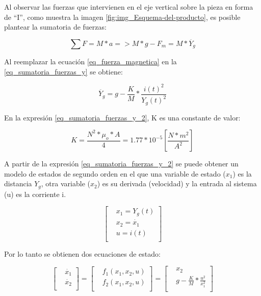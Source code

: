 \noindent Al observar las fuerzas que intervienen en el eje vertical sobre la pieza en forma de ``I'', como muestra la imagen \ref{fig:img_Esquema-del-producto}, es posible plantear la sumatoria de fuerzas:

\begin{equation}\label{eq_sumatoria_fuerzas_y}
	\sum F=M*a=>M*g-F_{m}=M*\ddot{Y_g}
\end{equation}

\noindent Al reemplazar la ecuación \ref{eq_fuerza_magnetica} en la \ref{eq_sumatoria_fuerzas_y} se obtiene:

\begin{equation}\label{eq_sumatoria_fuerzas_y_2}
	\ddot{Y_g}=g-\frac{K}{M}*\frac{i(t)^{2}}{Y_g(t)^{2}}
\end{equation}

\noindent En la expresión \ref{eq_sumatoria_fuerzas_y_2}, K es una constante de valor:

\begin{equation}
	K=\frac{N^{2}*\mu_{o}*A}{4}=1.77*10^{-5} [\frac{N*m^2}{A^2}]
\end{equation}

A partir de la expresión \ref{eq_sumatoria_fuerzas_y_2} se puede obtener un modelo de estados de segundo orden en el que una variable de estado ($x_1$) es la distancia $Y_g$, otra variable ($x_2$) es su derivada (velocidad) y la entrada al sistema (u) es la corriente i. 


\begin{equation*}
	\begin{bmatrix} %
	&x_{1}=Y_g(t)\\
	&x_{2}=\dot{x_{1}}\\
	&u=i(t)\\
	\end{bmatrix}
\end{equation*}

\noindent Por lo tanto se obtienen dos ecuaciones de estado:

\begin{equation} \label{eq_modelo_estados}
	\begin{bmatrix} %
		&\dot{x_{1}}\\
		&\dot{x_{2}}\\
	\end{bmatrix}
=
	\begin{bmatrix} %
	&f_1(x_1,x_2,u)\\
	&f_2(x_1,x_2,u)\\
\end{bmatrix}
=
	\begin{bmatrix} %
		&x_{2}\\
		&g-\frac{K}{M}*\frac{u^{2}}{x_{1}^{2}}\\
	\end{bmatrix}
\end{equation}


